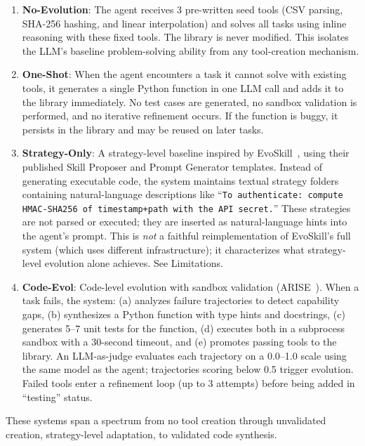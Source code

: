 \documentclass[sigplan,review,anonymous]{acmart}
\begin{document}
\begin{enumerate}
\item \textbf{No-Evolution}: The agent receives 3 pre-written seed tools (CSV parsing, SHA-256 hashing, and linear interpolation) and solves all tasks using inline reasoning with these fixed tools. The library is never modified. This isolates the LLM's baseline problem-solving ability from any tool-creation mechanism.

\item \textbf{One-Shot}: When the agent encounters a task it cannot solve with existing tools, it generates a single Python function in one LLM call and adds it to the library immediately. No test cases are generated, no sandbox validation is performed, and no iterative refinement occurs. If the function is buggy, it persists in the library and may be reused on later tasks.

\item \textbf{Strategy-Only}: A strategy-level baseline inspired by EvoSkill~\cite{alzubi2026evoskill}, using their published Skill Proposer and Prompt Generator templates. Instead of generating executable code, the system maintains textual strategy folders containing natural-language descriptions like ``\texttt{To authenticate: compute HMAC-SHA256 of timestamp+path with the API secret.}'' These strategies are not parsed or executed; they are inserted as natural-language hints into the agent's prompt. This is \emph{not} a faithful reimplementation of EvoSkill's full system (which uses different infrastructure); it characterizes what strategy-level evolution alone achieves. See Limitations.

\item \textbf{Code-Evol}: Code-level evolution with sandbox validation (ARISE~\cite{kaliyev2026arise}). When a task fails, the system: (a) analyzes failure trajectories to detect capability gaps, (b) synthesizes a Python function with type hints and docstrings, (c) generates 5--7 unit tests for the function, (d) executes both in a subprocess sandbox with a 30-second timeout, and (e) promotes passing tools to the library. An LLM-as-judge evaluates each trajectory on a 0.0--1.0 scale using the same model as the agent; trajectories scoring below 0.5 trigger evolution. Failed tools enter a refinement loop (up to 3 attempts) before being added in ``testing'' status.
\end{enumerate}

These systems span a spectrum from no tool creation through unvalidated creation, strategy-level adaptation, to validated code synthesis.
\end{document}
